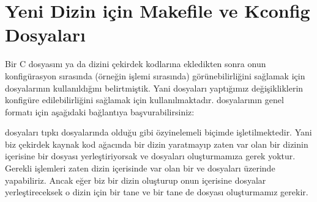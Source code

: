 \documentclass[a4paper,10pt,turkish]{sphinxmanual}
\begin{document}
\section{Yeni Dizin için Makefile ve Kconfig Dosyaları}
\label{\detokenize{kernelcompilation:yeni-dizin-icin-makefile-ve-kconfig-dosyalari}}
\sphinxAtStartPar
Bir C dosyasını ya da dizini çekirdek kodlarına ekledikten sonra onun konfigürasyon sırasında (örneğin
 işlemi sırasında) görünebilirliğini sağlamak için  dosyalarının
kullanıldığını belirtmiştik. Yani  dosyaları yaptığımız değişikliklerin konfigüre
edilebilirliğini sağlamak için kullanılmaktadır.  dosyalarının genel formatı için aşağıdaki
bağlantıya başvurabilirsiniz:
\begin{quote}

\sphinxAtStartPar
{}
\end{quote}

\sphinxAtStartPar
{} dosyaları tıpkı  dosyalarında olduğu gibi özyinelemeli biçimde işletilmektedir.
Yani biz çekirdek kaynak kod ağacında bir dizin yaratmayıp zaten var olan bir dizinin içerisine bir 
dosyası yerleştiriyorsak  ve  dosyaları oluşturmamıza gerek yoktur. Gerekli
işlemleri zaten dizin içerisinde var olan bir  ve  dosyaları üzerinde yapabiliriz.
Ancak eğer biz bir dizin oluşturup onun içerisine dosyalar yerleştireceksek o dizin için bir tane
 ve bir tane de  dosyası oluşturmamız gerekir.
\end{document}
